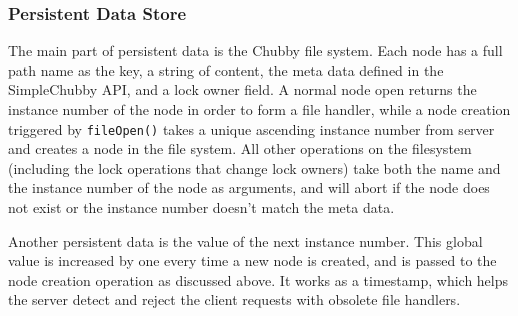 \subsubsection{Persistent Data Store}

The main part of persistent data is the Chubby file system. Each node has
a full path name as the key, a string of content, the meta data defined
in the SimpleChubby API, and a lock owner field. A normal node open returns
the instance number of the node in order to form a file handler, while
a node creation triggered by \texttt{fileOpen()} takes a unique ascending
instance number from server and creates a node in the file system. All other
operations on the filesystem (including the lock operations that change lock owners)
take both the name and the instance number of the node as arguments, and will
abort if the node does not exist or the instance number doesn't match the
meta data.

Another persistent data is the value of the next instance number. This global
value is increased by one every time a new node is created, and is passed
to the node creation operation as discussed above. It works as a timestamp,
which helps the server detect and reject the client requests with obsolete
file handlers.
